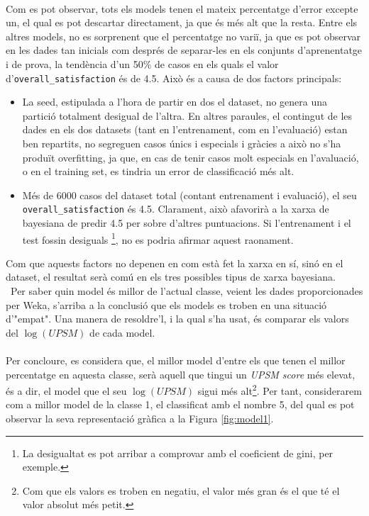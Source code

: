 	\\
	Com es pot observar, tots els models tenen el mateix percentatge d'error excepte un, el qual es pot descartar directament, ja que és més alt que la resta. Entre els altres models, no es sorprenent que el percentatge no variï, ja que es pot observar en les dades tan inicials com després de separar-les en els conjunts d'aprenentatge i de prova,  la tendència d'un 50\% de casos en els quals el valor d'\verb|overall_satisfaction| és de 4.5.
	Això és a causa de dos factors principals:
	\begin{itemize}
		\item La seed, estipulada a l'hora de partir en dos el dataset, no genera una partició totalment desigual de l'altra. En altres paraules, el contingut de les dades en els dos datasets (tant en l'entrenament, com en l'evaluació) estan ben repartits, no segreguen casos únics i especials i gràcies a això no s'ha produït overfitting, ja que, en cas de tenir casos molt especials en l'avaluació, o en el training set, es tindria un error de classificació més alt.
		\item Més de 6000 casos del dataset total (contant entrenament i evaluació), el seu \texttt{overall\_satisfaction} és 4.5. Clarament, això afavorirà a la xarxa de bayesiana de predir 4.5 per sobre d'altres puntuacions. Si l'entrenament i el test fossin desiguals \footnote{La desigualtat es pot arribar a comprovar amb el coeficient de gini, per exemple.}, no es podria afirmar aquest raonament.
	\end{itemize}
Com que aquests factors no depenen en com està fet la xarxa en sí, sinó en el dataset, el resultat serà comú en els tres possibles tipus de xarxa bayesiana.
\\
\
	Per saber quin model és millor de l'actual classe, veient les dades proporcionades per Weka, s'arriba a la conclusió que els models es troben en una situació d'"empat". Una manera de resoldre'l, i la qual s'ha usat, és comparar els valors del $\log(UPSM)$ de cada model.
	\\
	\\
	Per concloure, es considera que, el millor model d'entre els que tenen el millor percentatge en aquesta classe, serà aquell que tingui un \textit{UPSM score} més elevat, és a dir, el model que el seu $\log(UPSM)$ sigui més alt\footnote{Com que els valors es troben en negatiu, el valor més gran és el que té el valor absolut més petit.}. Per tant, considerarem com a millor model de la classe 1, el classificat amb el nombre 5, del qual es pot observar la seva representació gràfica a la Figura \ref{fig:model1}.
	
